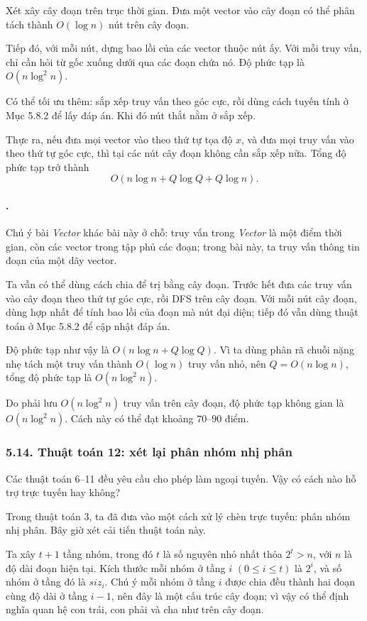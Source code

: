 \documentclass[11pt]{article}
\begin{document}
Xét xây cây đoạn trên trục thời gian. Đưa một vector vào cây đoạn có thể phân
tách thành \(O(\log n)\) nút trên cây đoạn.

Tiếp đó, với mỗi nút, dựng bao lồi của các vector thuộc nút ấy. Với mỗi truy
vấn, chỉ cần hỏi từ gốc xuống dưới qua các đoạn chứa nó. Độ phức tạp là
\(O(n\log^2 n)\).

Có thể tối ưu thêm: sắp xếp truy vấn theo góc cực, rồi dùng cách tuyến tính ở
Mục 5.8.2 để lấy đáp án. Khi đó nút thắt nằm ở sắp xếp.

Thực ra, nếu đưa mọi vector vào theo thứ tự tọa độ \(x\), và đưa mọi truy vấn
vào theo thứ tự góc cực, thì tại các nút cây đoạn không cần sắp xếp nữa. Tổng
độ phức tạp trở thành
\[
  O(n\log n+Q\log Q+Q\log n).
\]

\paragraph{.}
Chú ý bài \emph{Vector} khác bài này ở chỗ: truy vấn trong \emph{Vector} là
một điểm thời gian, còn các vector trong tập phủ các đoạn; trong bài này, ta
truy vấn thông tin đoạn của một dãy vector.

Ta vẫn có thể dùng cách chia để trị bằng cây đoạn. Trước hết đưa các truy vấn
vào cây đoạn theo thứ tự góc cực, rồi DFS trên cây đoạn. Với mỗi nút cây đoạn,
dùng hợp nhất để tính bao lồi của đoạn mà nút đại diện; tiếp đó vẫn dùng thuật
toán ở Mục 5.8.2 để cập nhật đáp án.

Độ phức tạp như vậy là \(O(n\log n+Q\log Q)\). Vì ta dùng phân rã chuỗi nặng
nhẹ tách một truy vấn thành \(O(\log n)\) truy vấn nhỏ, nên \(Q=O(n\log n)\),
tổng độ phức tạp là \(O(n\log^2 n)\).

Do phải lưu \(O(n\log^2 n)\) truy vấn trên cây đoạn, độ phức tạp không gian là
\(O(n\log^2 n)\). Cách này có thể đạt khoảng \(70\)--\(90\) điểm.

\subsubsection*{5.14. Thuật toán 12: xét lại phân nhóm nhị phân}

Các thuật toán 6--11 đều yêu cầu cho phép làm ngoại tuyến. Vậy có cách nào hỗ
trợ trực tuyến hay không?

Trong thuật toán 3, ta đã đưa vào một cách xử lý chèn trực tuyến: phân nhóm
nhị phân. Bây giờ xét cải tiến thuật toán này.

Ta xây \(t+1\) tầng nhóm, trong đó \(t\) là số nguyên nhỏ nhất thỏa
\(2^t>n\), với \(n\) là độ dài đoạn hiện tại. Kích thước mỗi nhóm ở tầng \(i\)
\((0\le i\le t)\) là \(2^i\), và số nhóm ở tầng đó là \(\mathit{siz}_i\). Chú
ý mỗi nhóm ở tầng \(i\) được chia đều thành hai đoạn cùng độ dài ở tầng
\(i-1\), nên đây là một cấu trúc cây đoạn; vì vậy có thể định nghĩa quan hệ
con trái, con phải và cha như trên cây đoạn.
\end{document}
